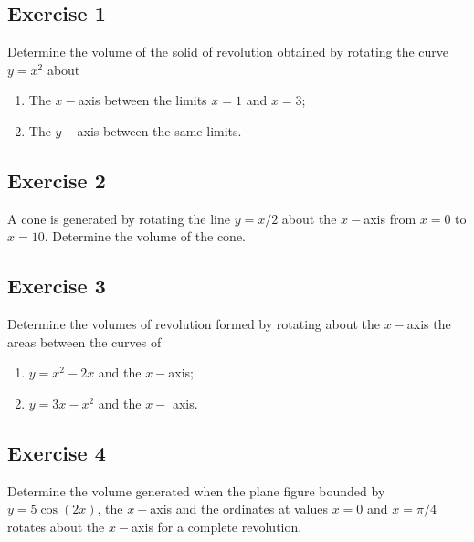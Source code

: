 \documentclass[
  11pt,
  oneside]{book}
\providecommand{\tightlist}{%
  \setlength{\itemsep}{0pt}\setlength{\parskip}{0pt}}
\newcommand{\slide}{}
\theoremstyle{definition}
\theoremstyle{definition}
\theoremstyle{definition}
\theoremstyle{definition}
\theoremstyle{remark}
\begin{document}
\slide

\subsection*{Exercise 1}\label{exercise-1-11}

Determine the volume of the solid of revolution obtained by rotating the curve \(y = x^2\) about

\begin{enumerate}
\def\labelenumi{\roman{enumi}.}
\tightlist
\item
  The \(x-\)axis between the limits \(x = 1\) and \(x = 3\);
\item
  The \(y-\)axis between the same limits.
\end{enumerate}

\slide

\subsection*{Exercise 2}\label{exercise-2-11}

A cone is generated by rotating the line \(y = x/2\) about the \(x-\)axis from \(x = 0\) to \(x = 10\). Determine the volume of the cone.

\slide

\subsection*{Exercise 3}\label{exercise-3-9}

Determine the volumes of revolution formed by rotating about the \(x-\)axis the areas between the curves of

\begin{enumerate}
\def\labelenumi{\roman{enumi}.}
\tightlist
\item
  \(y = x^2 - 2x\) and the \(x-\)axis;
\item
  \(y = 3x - x^2\) and the \(x-\) axis.
\end{enumerate}

\slide

\subsection*{Exercise 4}\label{exercise-4-7}

Determine the volume generated when the plane figure bounded by \(y = 5\cos(2x)\), the \(x-\)axis and the ordinates at values \(x = 0\) and \(x = \pi/4\) rotates about the \(x-\)axis for a complete revolution.
\end{document}
